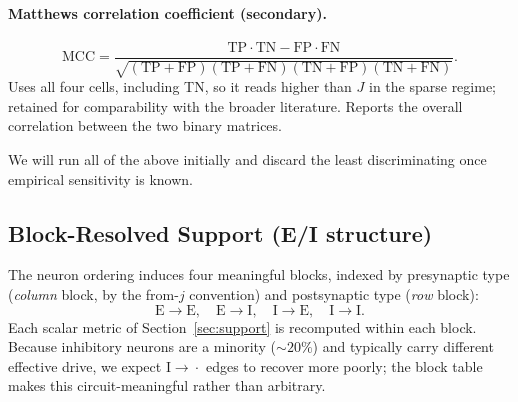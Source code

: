 \documentclass[11pt]{article}
\begin{document}
\paragraph{Matthews correlation coefficient (secondary).}
\begin{equation}
  \mathrm{MCC} =
  \frac{\mathrm{TP}\cdot\mathrm{TN} - \mathrm{FP}\cdot\mathrm{FN}}
       {\sqrt{(\mathrm{TP}+\mathrm{FP})(\mathrm{TP}+\mathrm{FN})
              (\mathrm{TN}+\mathrm{FP})(\mathrm{TN}+\mathrm{FN})}}.
\end{equation}
Uses all four cells, including TN, so it reads higher than $J$ in the sparse
regime; retained for comparability with the broader literature. Reports the
overall correlation between the two binary matrices.

We will run all of the above initially and discard the least discriminating
once empirical sensitivity is known.

\subsection{Block-Resolved Support (E/I structure)}
\label{sec:blocks}
The neuron ordering induces four meaningful blocks, indexed by presynaptic type
(\emph{column} block, by the from-$j$ convention) and postsynaptic type
(\emph{row} block):
\begin{equation}
  \text{E}\!\to\!\text{E},\quad
  \text{E}\!\to\!\text{I},\quad
  \text{I}\!\to\!\text{E},\quad
  \text{I}\!\to\!\text{I}.
\end{equation}
Each scalar metric of Section~\ref{sec:support} is recomputed within each block.
Because inhibitory neurons are a minority ($\sim 20\%$) and typically carry
different effective drive, we expect $\text{I}\!\to\!\cdot$ edges to recover
more poorly; the block table makes this circuit-meaningful rather than
arbitrary.
\end{document}
